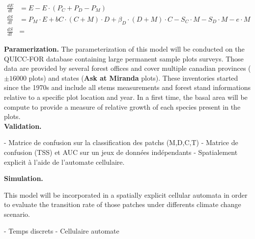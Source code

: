 \begin{equation}
	\begin{align*}
	\frac{dE}{dt} &= E - E \cdot (P_C +P_D - P_M) \\
	\frac{dS}{dt} &= P_M\cdot E + bC\cdot (C+M)\cdot D + \beta_D\cdot (D+M)\cdot C - S_C\cdot M -S_D\cdot M - e\cdot M \\
	\frac{dS}{dt} &=
	\end{align*}
\end{equation}






\textbf{Paramerization.} The parameterization of this model will be
conducted on the QUICC-FOR database containing large permanent sample plots
surveys. Those data are provided by several forest offices and cover multiple
canadian provinces ($\pm16 000$ plots) and states (\textbf{Ask at Miranda} plots).
These inventories started since the 1970s and include all stems measurements
and forest stand informations relative to a specific plot location and year. In a first
time, the basal area will be compute to provide a measure of relative growth
of each species present in the plots. \\

\textbf{Validation.}

- Matrice de confusion sur la classification des patchs (M,D,C,T)
- Matrice de confusion (TSS) et AUC sur un jeux de données indépendants 
- Spatialement explicit à l'aide de l'automate cellulaire.

\textbf{Simulation.}

This model will be incorporated in a spatially explicit cellular automata in
order to evaluate the transition rate of those patches under differents
climate change scenario.

- Temps discrets
- Cellulaire automate

\newpage


